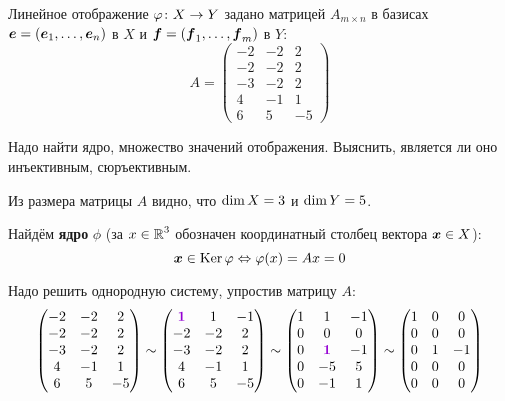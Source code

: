 \documentclass[a4paper,12pt]{article}
\begin{document}
  Линейное отображение $\phi\colon X \hm\to Y$ задано матрицей $A_{m\times n}$ в базисах $\bds e \hm= (\bds e_1, \ldots, \bds e_n)$ в $X$ и $\bds f \hm= (\bds f_1, \ldots, \bds f_m)$ в $Y$:
  \[
    A = \begin{pmatrix}
      -2 & -2 & 2\\
      -2 & -2 & 2\\
      -3 & -2 & 2\\
      4 & -1 & 1\\
      6 & 5 & -5
    \end{pmatrix}
  \]
  
  Надо найти ядро, множество значений отображения.
  Выяснить, является ли оно инъективным, сюръективным.
  
  \begin{solution}
    Из размера матрицы $A$ видно, что $\dim X \hm= 3$ и $\dim Y \hm= 5$.
    
    Найдём \textbf{ядро} $\phi$ (за $x \hm\in \RR^3$ обозначен координатный столбец вектора $\boldsymbol x \in X$):
    \[
      \boldsymbol x \in \operatorname{Ker}\varphi \Leftrightarrow \varphi(x) = Ax = 0
    \]
    
    Надо решить однородную систему, упростив матрицу $A$:
    \begin{equation}\label{p-23-29-gauss}
      \begin{pmatrix}
        -2 & -2 & 2\\
        -2 & -2 & 2\\
        -3 & -2 & 2\\
        4 & -1 & 1\\
        6 & 5 & -5
      \end{pmatrix}
      \sim \begin{pmatrix}
        \textcolor{violet}{\bds 1} & 1 & -1\\
        -2 & -2 & 2\\
        -3 & -2 & 2\\
        4 & -1 & 1\\
        6 & 5 & -5
      \end{pmatrix}
      \sim \begin{pmatrix}
        1 & 1 & -1\\
        0 & 0 & 0\\
        0 & \textcolor{violet}{\bds 1} & -1\\
        0 & -5 & 5\\
        0 & -1 & 1
      \end{pmatrix}
      \sim \begin{pmatrix}
        1 & 0 & 0\\
        0 & 0 & 0\\
        0 & 1 & -1\\
        0 & 0 & 0\\
        0 & 0 & 0
      \end{pmatrix}
    \end{equation}
    

\end{solution}
\end{document}
